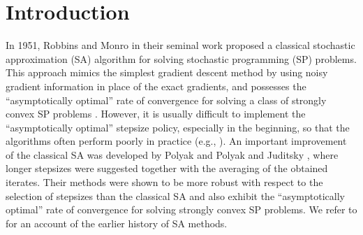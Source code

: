 \documentclass[final]{siamltex}
\newcommand{\bbr}{\mathbb{R}}
\begin{document}
\section{Introduction} \label{sec_intro}
In 1951, Robbins and Monro in their
seminal work \cite{RobMon51-1} proposed a classical stochastic
approximation (SA) algorithm for solving stochastic programming (SP) problems.
This approach mimics the simplest gradient descent
method by using noisy gradient information in place
of the exact gradients, and possesses the ``asymptotically optimal'' rate of convergence
for solving a class of strongly convex SP problems \cite{chu54,sac58}. However, it is usually
difficult to implement the ``asymptotically optimal'' stepsize
policy, especially in the beginning, so that the algorithms often
perform poorly in practice (e.g., \cite[Section 4.5.3]{Spall03}).
An important improvement of the classical SA was developed by Polyak \cite{pol90} and Polyak and Juditsky
\cite{pol92}, where longer stepsizes were suggested together with the averaging
of the obtained iterates. Their methods were shown to be more robust
with respect to the selection of stepsizes than the classical SA and also exhibit the ``asymptotically
optimal'' rate of convergence for solving strongly convex SP problems.
We refer to \cite{NJLS09-1} for an account of the earlier
history of SA methods.
\end{document}
